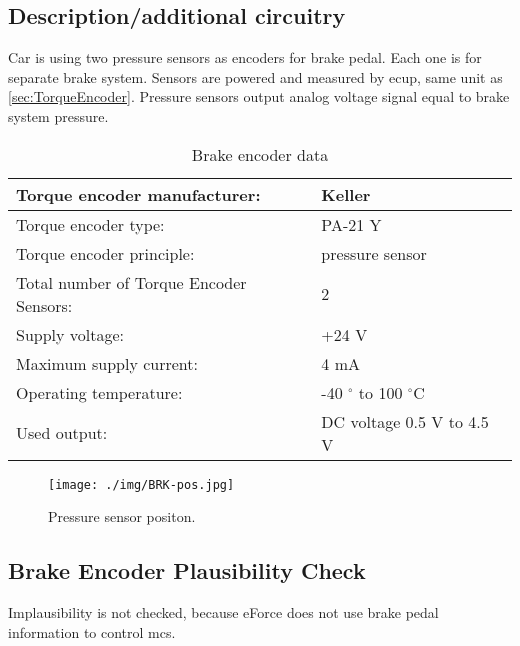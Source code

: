 \subsection{Description/additional circuitry}
Car is using two pressure sensors as encoders for brake pedal. Each one is for separate brake system. Sensors are powered and measured by \gls{ecup}, same unit as \ref{sec:TorqueEncoder}. Pressure sensors output analog voltage signal equal to brake system pressure. 


\begin{table}[H]
	\centering
	\caption{Brake encoder data}
	\begin{tabu}{|X|X|}
		\hline
		Torque encoder manufacturer: &  Keller \\\hline
		Torque encoder type: & PA-21 Y \\\hline
		Torque encoder principle: & pressure sensor \\\hline
		Total number of Torque Encoder Sensors: & 2 \\\hline
		Supply voltage: & +24 V \\\hline
		Maximum supply current: &  4 mA  \\\hline
		Operating temperature: & -40 $^\circ$ to 100 $^\circ$C \\\hline
		Used output: & DC voltage 0.5 V to 4.5 V \\\hline
	\end{tabu}%
	\label{tab:brake-general}%
\end{table}%

\begin{figure}[H]
	\begin{center}
		\texttt{[image: ./img/BRK-pos.jpg]}
		\caption{Pressure sensor positon.}
		\label{fig:brake_pressure_position}
	\end{center}
\end{figure}

\subsection{Brake Encoder Plausibility Check}
Implausibility is not checked, because eForce does not use brake pedal information to control \glspl{mc}.

%
%




